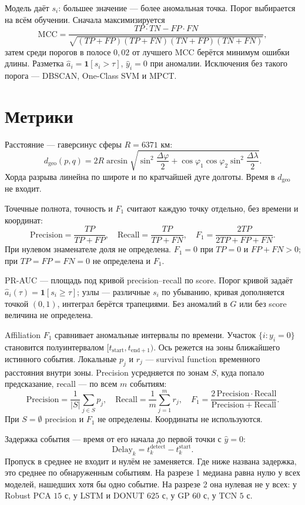 \documentclass[a4paper,12pt]{report}
\begin{document}
Модель даёт \(s_i\): большее значение — более аномальная точка. Порог выбирается на всём обучении. Сначала максимизируется
\[
\mathrm{MCC}=\frac{TP\cdot TN-FP\cdot FN}{\sqrt{(TP+FP)(TP+FN)(TN+FP)(TN+FN)}},
\]
затем среди порогов в полосе \(0{,}02\) от лучшего MCC берётся минимум ошибки длины. Разметка \(\hat a_i=\mathbf{1}[s_i>\tau]\), \(\hat y_i=0\) при аномалии. Исключения без такого порога — DBSCAN, One-Class SVM и MPCT.

\section{Метрики}

Расстояние — гаверсинус сферы \(R=6371\) км:
\[
d_{\mathrm{geo}}(p,q)=2R\arcsin\sqrt{\sin^2\frac{\Delta\varphi}{2}+\cos\varphi_1\cos\varphi_2\sin^2\frac{\Delta\lambda}{2}}.
\]
Хорда разрыва линейна по широте и по кратчайшей дуге долготы. Время в \(d_{\mathrm{geo}}\) не входит.

Точечные полнота, точность и \(F_1\) считают каждую точку отдельно, без времени и координат:
\[
\mathrm{Precision}=\frac{TP}{TP+FP},\quad
\mathrm{Recall}=\frac{TP}{TP+FN},\quad
F_1=\frac{2TP}{2TP+FP+FN}.
\]
При нулевом знаменателе доля не определена. \(F_1=0\) при \(TP=0\) и \(FP+FN>0\); при \(TP=FP=FN=0\) не определена и \(F_1\).

PR-AUC — площадь под кривой precision--recall по score. Порог кривой задаёт \(\hat a_i(\tau)=\mathbf{1}[s_i\ge\tau]\); узлы — различные \(s_i\) по убыванию, кривая дополняется точкой \((0,1)\), интеграл берётся трапециями. Без аномалий в \(G\) или без score величина не определена.

Affiliation \(F_1\) сравнивает аномальные интервалы по времени. Участок \(\{i:y_i=0\}\) становится полуинтервалом \([t_{\mathrm{start}},t_{\mathrm{end}+1})\). Ось режется на зоны ближайшего истинного события. Локальные \(p_j\) и \(r_j\) — survival function временного расстояния внутри зоны. Precision усредняется по зонам \(S\), куда попало предсказание, recall — по всем \(m\) событиям:
\[
\mathrm{Precision}=\frac{1}{|S|}\sum_{j\in S}p_j,\quad
\mathrm{Recall}=\frac{1}{m}\sum_{j=1}^{m}r_j,\quad
F_1=\frac{2\,\mathrm{Precision}\cdot\mathrm{Recall}}{\mathrm{Precision}+\mathrm{Recall}}.
\]
При \(S=\emptyset\) precision и \(F_1\) не определены. Координаты не используются.

Задержка события — время от его начала до первой точки с \(\hat y=0\):
\[
\mathrm{Delay}_k=t_k^{\mathrm{detect}}-t_k^{\mathrm{start}}.
\]
Пропуск в среднее не входит и нулём не заменяется. Где ниже названа задержка, это среднее по обнаруженным событиям. На разрезе 1 медиана равна нулю у всех моделей, нашедших хотя бы одно событие. На разрезе 2 она нулевая не у всех: у Robust PCA \(15\) с, у LSTM и DONUT \(625\) с, у GP \(60\) с, у TCN \(5\) с.
\end{document}
